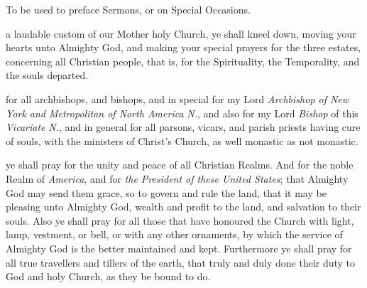 \vspace{-0.5\baselineskip}

\begin{secrubric}
	{To be used to preface Sermons, or on Special Occasions.}
\end{secrubric}

\vspace{-0.25\baselineskip}


 a laudable custom of our Mother holy Church, ye shall kneel down, moving your hearts unto Almighty God, and making your special prayers for the three estates, concerning all Christian people, that is, for the Spirituality, the Temporality, and the souls departed.

 for all archbishops, and bishops, and in special for my Lord \textit{Archbishop of New York and Metropolitan of North America} \textit{N.}, and also for my Lord \textit{Bishop} of this \textit{Vicariate} \textit{N.}, and in general for all parsons, vicars, and parish priests having cure of souls, with the ministers of Christ's Church, as well monastic as not monastic.

 ye shall pray for the unity and peace of all Christian Realms. And for the noble Realm of \textit{America}, and for \textit{the President of these United States}; that Almighty God may send them grace, so to govern and rule the land, that it may be pleasing unto Almighty God, wealth and profit to the land, and salvation to their souls. Also ye shall pray for all those that have honoured the Church with light, lamp, vestment, or bell, or with any other ornaments, by which the service of Almighty God is the better maintained and kept. Furthermore ye shall pray for all true travellers and tillers of the earth, that truly and duly done their duty to God and holy Church, as they be bound to do.


